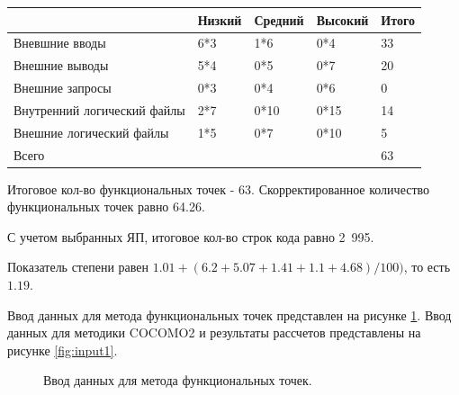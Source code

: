 \documentclass[a4paper,14pt]{article}
\begin{document}
\begin{table}[H]
\begin{tabular}{|l|l|l|l|l|}
\hline
                            & Низкий & Средний                  & Высокий                  & Итого \\ \hline
Вневшние вводы              & 6*3    & 1*6                      & 0*4                      & 33    \\ \hline
Внешние выводы              & 5*4    & 0*5                      & 0*7                      & 20    \\ \hline
Внешние запросы             & 0*3    & {0*4} & {0*6} & 0     \\ \hline
Внутренний логический файлы & 2*7    & 0*10                     & 0*15                     & 14    \\ \hline
Внешние логический файлы    & 1*5    & 0*7                      & 0*10                     & 5    \\ \hline
Всего    &     &                      &                    & 63   \\ \hline
\end{tabular}
\end{table}

Итоговое кол-во функциональных точек - 63. Скорректированное количество функциональных точек равно 64.26.

С учетом выбранных ЯП, итоговое кол-во строк кода равно 2 995.

Показатель степени равен $1.01 + (6.2+5.07+1.41+1.1+4.68) / 100)$, то есть $1.19$.

Ввод данных для метода функциональных точек представлен на рисунке \ref{fig:fp_set}. Ввод данных для методики COCOMO2 и результаты рассчетов представлены на рисунке \ref{fig:input1}. 

\newpage
\begin{figure}[!h]
         \caption{Ввод данных для метода функциональных точек.}
    \label{fig:fp_set}
\end{figure}
\end{document}

